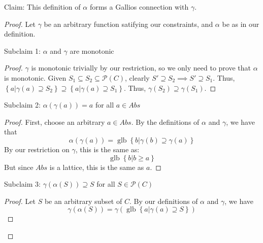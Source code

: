 \documentclass{article}
\newcommand{\powerset}{\mathcal{P}}
\newcommand{\glb}{\operatorname{glb}}
\begin{document}
Claim: This definition of $\alpha$ forms a Gallios connection with $\gamma$.
\begin{proof}
Let $\gamma$ be an arbitrary function satifying our constraints, and $\alpha$
be as in our definition.

Subclaim 1: $\alpha$ and $\gamma$ are monotonic
\begin{proof}
$\gamma$ is monotonic trivially by our restriction, so we only need to prove
that $\alpha$ is monotonic.
Given $S_1 \subseteq S_2 \subseteq \powerset(C)$, clearly
$S' \supseteq S_2 \implies S' \supseteq S_1$.
Thus, 
$
\left\{ a | \gamma(a) \supseteq S_2 \right\} \supseteq \left\{ a | \gamma(a)
\supseteq S_1 \right\}.
$
 Thus,
$\gamma(S_2) \supseteq \gamma(S_1)$.
\end{proof}

Subclaim 2: $\alpha(\gamma(a)) = a$ for all $a \in Abs$
\begin{proof}
First, choose an arbitrary $a \in Abs$.
By the definitions of $\alpha$ and $\gamma$, we have that
\[
\alpha(\gamma(a)) = \glb \left\{ b | \gamma(b) \supseteq \gamma(a) \right\}
\]
By our restriction on $\gamma$, this is the same as:
\[
\glb \left\{ b | b \ge a \right\}
\]
But since $Abs$ is a lattice, this is the same as $a$.
\end{proof}

Subclaim 3: $\gamma(\alpha(S)) \supseteq S$ for all $S \in \powerset(C)$
\begin{proof}
Let $S$ be an arbitrary subset of $C$.
By our definitions of $\alpha$ and $\gamma$, we have
\[
\gamma(\alpha(S)) =  \gamma( \glb \left\{ a | \gamma(a) \supseteq S \right\} )
\]
\end{proof}

\end{proof}
\end{document}
